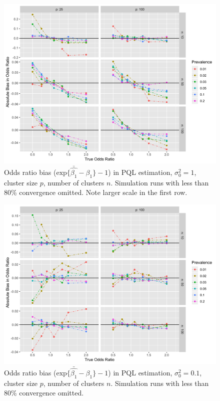 \documentclass{article}
\begin{document}
\begin{flushleft}
\begin{figure}[]
\begin{center}
\includegraphics[width=\textwidth]{_bias_pql_sbs1.png}
  \caption{Odds ratio bias ($\text{exp} \{ \bar{\hat{\beta_1}} - \beta_1 \}-1$) in PQL estimation, $\sigma^2_0=1$, cluster size $p$, number of clusters $n$. Simulation runs with less than 80\% convergence omitted. Note larger scale in the first row.}
    \label{fig:_bias_pql_6}
\end{center}
\end{figure}

\begin{figure}[]
\begin{center}
\includegraphics[width=\textwidth]{_bias_pql_sbspt1.png}
  \caption{Odds ratio bias ($\text{exp} \{ \bar{\hat{\beta_1}} - \beta_1 \} - 1$) in PQL estimation, $\sigma^2_0=0.1$, cluster size $p$, number of clusters $n$. Simulation runs with less than 80\% convergence omitted.}
    \label{fig:_bias_pql_sbs_pt1}
\end{center}
\end{figure}


\end{flushleft}
\end{document}
